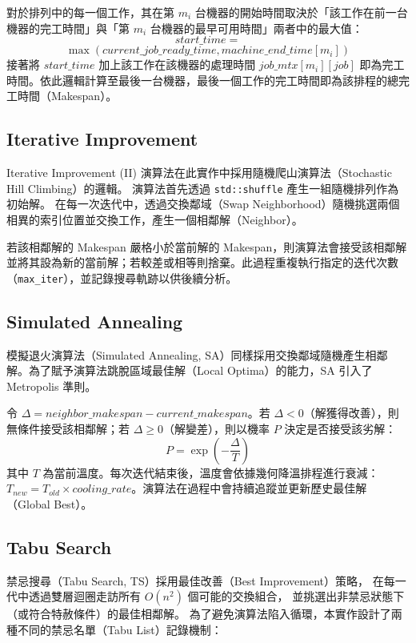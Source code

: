 \documentclass[conference]{IEEEtran}
\begin{document}
對於排列中的每一個工作，其在第 $m_i$ 台機器的開始時間取決於「該工作在前一台機器的完工時間」與「第 $m_i$ 台機器的最早可用時間」兩者中的最大值：
$$start\_time =$$
$$ \max(current\_job\_ready\_time, machine\_end\_time[m_i])$$
接著將 $start\_time$ 加上該工作在該機器的處理時間 $job\_mtx[m_i][job]$ 即為完工時間。依此邏輯計算至最後一台機器，最後一個工作的完工時間即為該排程的總完工時間（Makespan）。

\subsection{Iterative Improvement} 
Iterative Improvement (II) 演算法在此實作中採用隨機爬山演算法（Stochastic Hill Climbing）的邏輯。
演算法首先透過 \texttt{std::shuffle} 產生一組隨機排列作為初始解。
在每一次迭代中，透過交換鄰域（Swap Neighborhood）隨機挑選兩個相異的索引位置並交換工作，產生一個相鄰解（Neighbor）。

若該相鄰解的 Makespan 嚴格小於當前解的 Makespan，則演算法會接受該相鄰解並將其設為新的當前解；若較差或相等則捨棄。此過程重複執行指定的迭代次數（\texttt{max\_iter}），並記錄搜尋軌跡以供後續分析。

\subsection{Simulated Annealing}
模擬退火演算法（Simulated Annealing, SA）同樣採用交換鄰域隨機產生相鄰解。為了賦予演算法跳脫區域最佳解（Local Optima）的能力，SA 引入了 Metropolis 準則。

令 $\Delta = neighbor\_makespan - current\_makespan$。若 $\Delta < 0$（解獲得改善），則無條件接受該相鄰解；若 $\Delta \ge 0$（解變差），則以機率 $P$ 決定是否接受該劣解：
$$P = \exp\left(-\frac{\Delta}{T}\right)$$
其中 $T$ 為當前溫度。每次迭代結束後，溫度會依據幾何降溫排程進行衰減：$T_{new} = T_{old} \times cooling\_rate$。演算法在過程中會持續追蹤並更新歷史最佳解（Global Best）。

\subsection{Tabu Search}
禁忌搜尋（Tabu Search, TS）採用最佳改善（Best Improvement）策略，
在每一代中透過雙層迴圈走訪所有 $O(n^2)$ 個可能的交換組合，
並挑選出非禁忌狀態下（或符合特赦條件）的最佳相鄰解。
為了避免演算法陷入循環，本實作設計了兩種不同的禁忌名單（Tabu List）記錄機制：
\end{document}
